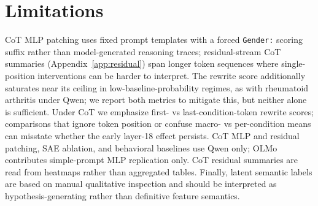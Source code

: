 \documentclass{article}
\begin{document}
\section{Limitations}
CoT MLP patching uses fixed prompt templates with a forced \texttt{Gender:} scoring suffix rather than model-generated reasoning traces; residual-stream CoT summaries (Appendix~\ref{app:residual}) span longer token sequences where single-position interventions can be harder to interpret. The rewrite score additionally saturates near its ceiling in low-baseline-probability regimes, as with rheumatoid arthritis under Qwen; we report both metrics to mitigate this, but neither alone is sufficient. Under CoT we emphasize first- vs last-condition-token rewrite scores; comparisons that ignore token position or confuse macro- vs per-condition means can misstate whether the early layer-18 effect persists. CoT MLP and residual patching, SAE ablation, and behavioral baselines use Qwen only; OLMo contributes simple-prompt MLP replication only. CoT residual summaries are read from heatmaps rather than aggregated tables. Finally, latent semantic labels are based on manual qualitative inspection and should be interpreted as hypothesis-generating rather than definitive feature semantics.
\end{document}
